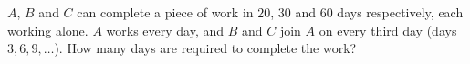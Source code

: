 $A$, $B$ and $C$ can complete a piece of work in $20$, $30$ and $60$ days respectively, each working alone. $A$ works every day, and $B$ and $C$ join $A$ on every third day (days $3,6,9,\dots$). How many days are required to complete the work?

